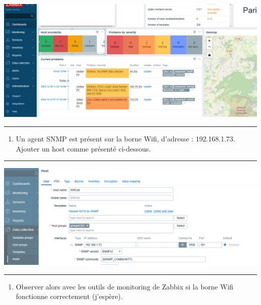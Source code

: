 \documentclass[french, 12pt]{article}%
\begin{document}
\begin{center}
\includegraphics[scale=0.4]{./ressource/zabbix.png}
\end{center}

\begin{center}
 \rule{0.75\linewidth}{1pt}
 \end{center}

\begin{enumerate}
\item Un agent SNMP est présent sur la borne Wifi, d'adresse : 192.168.1.73. Ajouter un host comme présenté ci-dessous. 

\end{enumerate}

\begin{center}
 \rule{0.75\linewidth}{1pt}
 \end{center}

\begin{center}
\includegraphics[scale=0.4]{./ressource/wifiSnmp}
\end{center}

\begin{center}
 \rule{0.75\linewidth}{1pt}
 \end{center}

\begin{enumerate}
\item Observer alors avec les outils de monitoring de Zabbix si la borne Wifi fonctionne correctement (j'espère). 
\end{enumerate}
\end{document}
